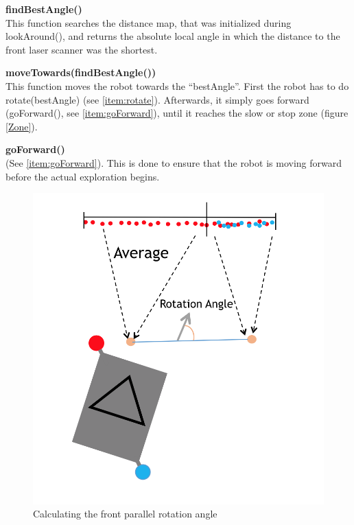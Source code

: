 \begin{description}
\item \textbf{findBestAngle()} \hfill \\
This function searches the distance map, that was initialized during lookAround(), and returns the absolute local angle in which the distance to the front laser scanner was the shortest. 

\item \textbf{moveTowards(findBestAngle())} \hfill \\
This function moves the robot towards the ``bestAngle''. First the robot has to do rotate(bestAngle) (see \ref{item:rotate}). Afterwards, it simply goes forward (goForward(), see \ref{item:goForward}), until it reaches the slow or stop zone (figure \ref{Zone}).

\item \textbf{goForward()} \hfill \\
(See \ref{item:goForward}). This is done to ensure that the robot is moving forward before the actual exploration begins.
 
\begin{figure}[ht]
\centering
\includegraphics[scale=0.575]{graphics/front_parallel.png}
\caption{Calculating the front parallel rotation angle}
\label{parallel}
\centering
\end{figure} 
 

\end{description}
